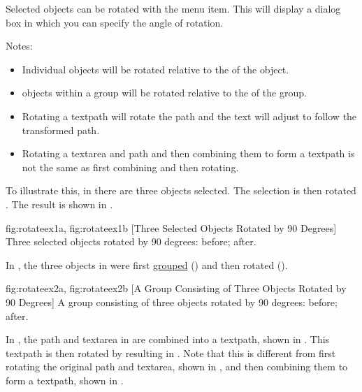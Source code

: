 Selected \glspl{object} can be rotated with the
 menu item. This will display a dialog box in
which you can specify the angle of rotation.

Notes:
\begin{itemize}
\item Individual \glspl{object}
will be rotated relative to the  of the \gls{object}.

\item \Glspl*{object} within a
\gls{group} will be rotated relative to the  of the
group.

\item Rotating a \gls{textpath} will rotate the path and the text
will adjust to follow the transformed path.

\item Rotating a \gls*{textarea} and \gls*{path} and then combining
them to form a \gls*{textpath} is not the same as first combining
and then rotating.

\end{itemize}

To illustrate this, in  there are three
\glspl*{object} selected.  The selection is then rotated
.  The result is shown in .

{
 {fig:rotateex1a}{}{},
 {fig:rotateex1b}{}{}
}
[Three Selected Objects Rotated by 90 Degrees]
{Three selected objects rotated by 90 degrees: 
 before;
 after.}

In , the three objects in
 were first \hyperref[sec:grouping]{grouped}
() and then rotated 
().

{
 {fig:rotateex2a}{}{},
 {fig:rotateex2b}{}{}
}
[A Group Consisting of Three Objects Rotated by 90 Degrees]
{A group consisting of three objects rotated by 90 degrees:
 before;  after.}

In , the \gls*{path} and
\gls*{textarea} in  are
combined into a \gls*{textpath}, shown in
. This \gls*{textpath} is then
rotated by  resulting in
. Note that this is different
from first rotating the original \gls*{path} and \gls*{textarea},
shown in , and then combining
them to form a \gls*{textpath}, shown in
.

